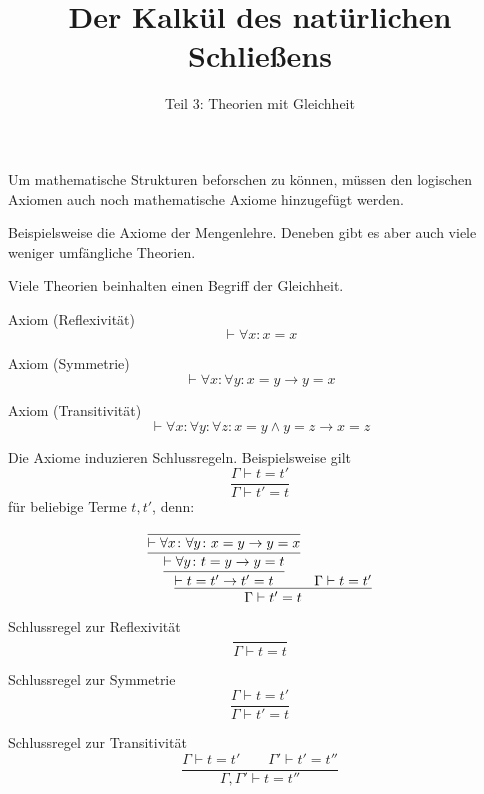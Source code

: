 \documentclass[8pt]{beamer}
\title{Der Kalkül des natürlichen Schließens}
\subtitle{Teil 3: Theorien mit Gleichheit}
\date{}
\newcommand{\parspace}{\vspace{0.8em}}
\newcommand{\cond}{\rightarrow}
\begin{document}
\begin{frame}
\maketitle
\end{frame}

\begin{frame}
Um mathematische Strukturen beforschen zu können, müssen den
logischen Axiomen auch noch mathematische Axiome hinzugefügt
werden.

\parspace
Beispielsweise die Axiome der Mengenlehre. Deneben gibt es aber auch
viele weniger umfängliche Theorien.

\parspace
Viele Theorien beinhalten einen Begriff der Gleichheit.
\end{frame}

\begin{frame}
\begin{block}{Axiom (Reflexivität)}
\[\vdash\forall x\colon x=x\]
\end{block}\pause

\begin{block}{Axiom (Symmetrie)}
\[\vdash\forall x\colon\forall y\colon x=y\cond y=x\]
\end{block}\pause

\begin{block}{Axiom (Transitivität)}
\[\vdash\forall x\colon\forall y\colon\forall z\colon x=y\land y=z\cond x=z\]
\end{block}
\end{frame}

\begin{frame}
Die Axiome induzieren Schlussregeln. Beispielsweise gilt
\[\dfrac{\Gamma\vdash t=t'}{\Gamma\vdash t'=t}\]
für beliebige Terme $t,t'$, denn:

\[
\infer{\Gamma\vdash t'=t}{
  \infer{\vdash t=t'\cond t'=t}{
    \infer{\vdash\forall y\colon t=y\cond y=t}{
      \infer{\vdash\forall x\colon\forall y\colon x=y\cond y=x}{}}}
& \Gamma\vdash t=t'}
\]
\end{frame}

\begin{frame}
\begin{block}{Schlussregel zur Reflexivität}
\[\dfrac{}{\Gamma\vdash t=t}\]
\end{block}\pause

\begin{block}{Schlussregel zur Symmetrie}
\[\dfrac{\Gamma\vdash t=t'}{\Gamma\vdash t'=t}\]
\end{block}\pause

\begin{block}{Schlussregel zur Transitivität}
\[\dfrac{\Gamma\vdash t=t'\qquad\Gamma'\vdash t'=t''}{\Gamma,\Gamma'\vdash t=t''}\]
\end{block}
\end{frame}
\end{document}
